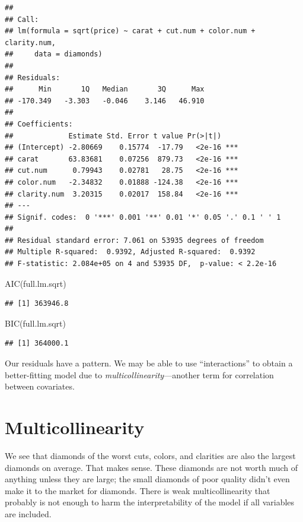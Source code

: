 \documentclass[
]{book}
\newenvironment{Shaded}{\begin{snugshade}}{\end{snugshade}}
\newcommand{\FunctionTok}[1]{\textcolor[rgb]{0.00,0.00,0.00}{#1}}
\newcommand{\NormalTok}[1]{#1}
\begin{document}
\begin{verbatim}
## 
## Call:
## lm(formula = sqrt(price) ~ carat + cut.num + color.num + clarity.num, 
##     data = diamonds)
## 
## Residuals:
##      Min       1Q   Median       3Q      Max 
## -170.349   -3.303   -0.046    3.146   46.910 
## 
## Coefficients:
##             Estimate Std. Error t value Pr(>|t|)    
## (Intercept) -2.80669    0.15774  -17.79   <2e-16 ***
## carat       63.83681    0.07256  879.73   <2e-16 ***
## cut.num      0.79943    0.02781   28.75   <2e-16 ***
## color.num   -2.34832    0.01888 -124.38   <2e-16 ***
## clarity.num  3.20315    0.02017  158.84   <2e-16 ***
## ---
## Signif. codes:  0 '***' 0.001 '**' 0.01 '*' 0.05 '.' 0.1 ' ' 1
## 
## Residual standard error: 7.061 on 53935 degrees of freedom
## Multiple R-squared:  0.9392, Adjusted R-squared:  0.9392 
## F-statistic: 2.084e+05 on 4 and 53935 DF,  p-value: < 2.2e-16
\end{verbatim}

\begin{Shaded}
\begin{Highlighting}[]
\FunctionTok{AIC}\NormalTok{(full.lm.sqrt)}
\end{Highlighting}
\end{Shaded}

\begin{verbatim}
## [1] 363946.8
\end{verbatim}

\begin{Shaded}
\begin{Highlighting}[]
\FunctionTok{BIC}\NormalTok{(full.lm.sqrt)}
\end{Highlighting}
\end{Shaded}

\begin{verbatim}
## [1] 364000.1
\end{verbatim}

Our residuals have a pattern. We may be able to use ``interactions'' to obtain a better-fitting model due to \emph{multicollinearity}---another term for correlation between covariates.

\hypertarget{multicollinearity}{%
\section{Multicollinearity}\label{multicollinearity}}

We see that diamonds of the worst cuts, colors, and clarities are also the largest diamonds on average. That makes sense. These diamonds are not worth much of anything unless they are large; the small diamonds of poor quality didn't even make it to the market for diamonds. There is weak multicollinearity that probably is not enough to harm the interpretability of the model if all variables are included.
\end{document}
